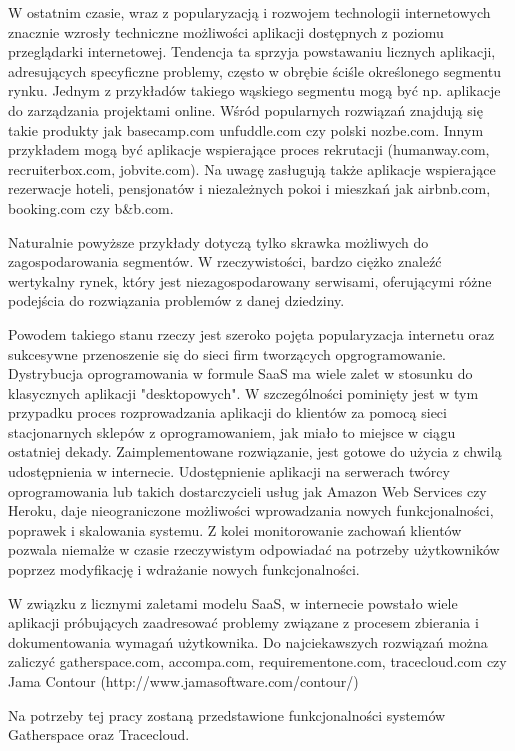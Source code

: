       W ostatnim czasie, wraz z popularyzacją i rozwojem technologii internetowych znacznie wzrosły techniczne możliwości aplikacji dostępnych z poziomu przeglądarki internetowej. Tendencja ta sprzyja powstawaniu licznych aplikacji, adresujących specyficzne problemy, często w obrębie ściśle określonego segmentu rynku. Jednym z przykładów takiego wąskiego segmentu mogą być np. aplikacje do zarządzania projektami online. Wśród popularnych rozwiązań znajdują się takie produkty jak basecamp.com unfuddle.com czy polski nozbe.com. Innym przykładem mogą być aplikacje wspierające proces rekrutacji (humanway.com, recruiterbox.com, jobvite.com). Na uwagę zasługują także aplikacje wspierające rezerwacje hoteli, pensjonatów i niezależnych pokoi i mieszkań jak airbnb.com, booking.com czy b\&b.com. 

      Naturalnie powyższe przykłady dotyczą tylko skrawka możliwych do zagospodarowania segmentów. W rzeczywistości, bardzo ciężko znaleźć wertykalny rynek, który jest niezagospodarowany serwisami, oferującymi różne podejścia do rozwiązania problemów z danej dziedziny. 

      Powodem takiego stanu rzeczy jest szeroko pojęta popularyzacja internetu oraz sukcesywne przenoszenie się do sieci firm tworzących opgrogramowanie. Dystrybucja oprogramowania w formule SaaS ma wiele zalet w stosunku do klasycznych aplikacji "desktopowych". W szczególności pominięty jest w tym przypadku proces rozprowadzania aplikacji do klientów za pomocą sieci stacjonarnych sklepów z oprogramowaniem, jak miało to miejsce w ciągu ostatniej dekady. Zaimplementowane rozwiązanie, jest gotowe do użycia z chwilą udostępnienia w internecie. Udostępnienie aplikacji na serwerach twórcy oprogramowania lub takich dostarczycieli usług jak Amazon Web Services czy Heroku, daje nieograniczone możliwości wprowadzania nowych funkcjonalności, poprawek i skalowania systemu. Z kolei monitorowanie zachowań klientów pozwala niemalże w czasie rzeczywistym odpowiadać na potrzeby użytkowników poprzez modyfikację i wdrażanie nowych funkcjonalności. 

      W związku z licznymi zaletami modelu SaaS, w internecie powstało wiele aplikacji próbujących zaadresować problemy związane z procesem zbierania i dokumentowania wymagań użytkownika. Do najciekawszych rozwiązań można zaliczyć gatherspace.com, accompa.com, requirementone.com, tracecloud.com czy Jama Contour (http://www.jamasoftware.com/contour/)
    
      Na potrzeby tej pracy zostaną przedstawione funkcjonalności systemów Gatherspace oraz Tracecloud.

